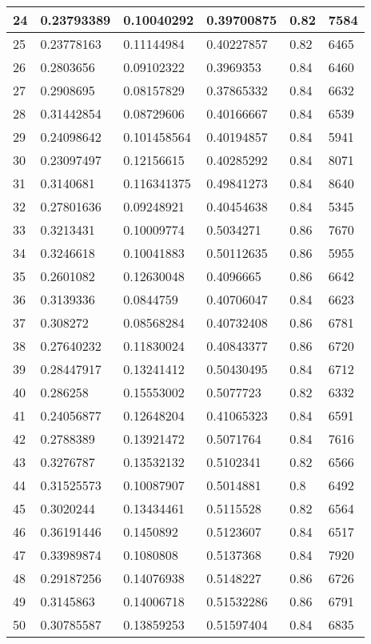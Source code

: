 \begin{longtable}{|l|l|l|l|l|l|}
24 & 0.23793389 & 0.10040292 & 0.39700875 & 0.82 & 7584 \\ \hline 
25 & 0.23778163 & 0.11144984 & 0.40227857 & 0.82 & 6465 \\ \hline 
26 & 0.2803656 & 0.09102322 & 0.3969353 & 0.84 & 6460 \\ \hline 
27 & 0.2908695 & 0.08157829 & 0.37865332 & 0.84 & 6632 \\ \hline 
28 & 0.31442854 & 0.08729606 & 0.40166667 & 0.84 & 6539 \\ \hline 
29 & 0.24098642 & 0.101458564 & 0.40194857 & 0.84 & 5941 \\ \hline 
30 & 0.23097497 & 0.12156615 & 0.40285292 & 0.84 & 8071 \\ \hline 
31 & 0.3140681 & 0.116341375 & 0.49841273 & 0.84 & 8640 \\ \hline 
32 & 0.27801636 & 0.09248921 & 0.40454638 & 0.84 & 5345 \\ \hline 
33 & 0.3213431 & 0.10009774 & 0.5034271 & 0.86 & 7670 \\ \hline 
34 & 0.3246618 & 0.10041883 & 0.50112635 & 0.86 & 5955 \\ \hline 
35 & 0.2601082 & 0.12630048 & 0.4096665 & 0.86 & 6642 \\ \hline 
36 & 0.3139336 & 0.0844759 & 0.40706047 & 0.84 & 6623 \\ \hline 
37 & 0.308272 & 0.08568284 & 0.40732408 & 0.86 & 6781 \\ \hline 
38 & 0.27640232 & 0.11830024 & 0.40843377 & 0.86 & 6720 \\ \hline 
39 & 0.28447917 & 0.13241412 & 0.50430495 & 0.84 & 6712 \\ \hline 
40 & 0.286258 & 0.15553002 & 0.5077723 & 0.82 & 6332 \\ \hline 
41 & 0.24056877 & 0.12648204 & 0.41065323 & 0.84 & 6591 \\ \hline 
42 & 0.2788389 & 0.13921472 & 0.5071764 & 0.84 & 7616 \\ \hline 
43 & 0.3276787 & 0.13532132 & 0.5102341 & 0.82 & 6566 \\ \hline 
44 & 0.31525573 & 0.10087907 & 0.5014881 & 0.8 & 6492 \\ \hline 
45 & 0.3020244 & 0.13434461 & 0.5115528 & 0.82 & 6564 \\ \hline 
46 & 0.36191446 & 0.1450892 & 0.5123607 & 0.84 & 6517 \\ \hline 
47 & 0.33989874 & 0.1080808 & 0.5137368 & 0.84 & 7920 \\ \hline 
48 & 0.29187256 & 0.14076938 & 0.5148227 & 0.86 & 6726 \\ \hline 
49 & 0.3145863 & 0.14006718 & 0.51532286 & 0.86 & 6791 \\ \hline 
50 & 0.30785587 & 0.13859253 & 0.51597404 & 0.84 & 6835 \\ \hline 
\end{longtable}